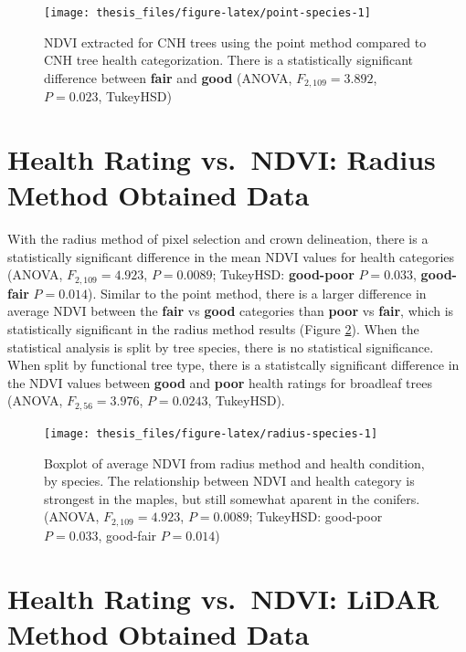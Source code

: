 \documentclass[12pt,twoside]{reedthesis}
\begin{document}
\begin{figure}

{\centering \texttt{[image: thesis\_files/figure-latex/point-species-1]} 

}

\caption[Point Method NDVI and Health Rating, by Species]{NDVI extracted for CNH trees using the point method
compared to CNH tree health categorization. There is a statistically
significant difference between \textbf{fair} and \textbf{good} (ANOVA,
\(F_{2, 109} = 3.892\), \(P = 0.023\), TukeyHSD)}\label{fig:point-species}
\end{figure}
\hypertarget{health-rating-vs.-ndvi-radius-method-obtained-data}{%
\section{Health Rating vs.~NDVI: Radius Method Obtained Data}\label{health-rating-vs.-ndvi-radius-method-obtained-data}}

With the radius method of pixel selection and crown delineation, there
is a statistically significant difference in the mean NDVI values for
health categories (ANOVA, \(F_{2,109}=4.923\), \(P = 0.0089\); TukeyHSD:
\textbf{good-poor} \(P = 0.033\), \textbf{good-fair} \(P = 0.014\)). Similar to the
point method, there is a larger difference in average NDVI between the
\textbf{fair} vs \textbf{good} categories than \textbf{poor} vs \textbf{fair}, which is
statistically significant in the radius method results (Figure
\ref{fig:radius-species}). When the statistical analysis is split by
tree species, there is no statistical significance. When split by
functional tree type, there is a statistcally significant difference in
the NDVI values between \textbf{good} and \textbf{poor} health ratings for
broadleaf trees (ANOVA, \(F_{2,56}=3.976\), \(P = 0.0243\), TukeyHSD).
\begin{figure}

{\centering \texttt{[image: thesis\_files/figure-latex/radius-species-1]} 

}

\caption[Radius method mean NDVI and health condition by species]{Boxplot of average NDVI from radius method and health condition, by species. The relationship between NDVI and health category is strongest in the maples, but still somewhat aparent in the conifers. (ANOVA, $F_{2,109}=4.923$, $P = 0.0089$; TukeyHSD: good-poor $P = 0.033$, good-fair $P = 0.014$)}\label{fig:radius-species}
\end{figure}
\hypertarget{health-rating-vs.-ndvi-lidar-method-obtained-data}{%
\section{Health Rating vs.~NDVI: LiDAR Method Obtained Data}\label{health-rating-vs.-ndvi-lidar-method-obtained-data}}
\end{document}
